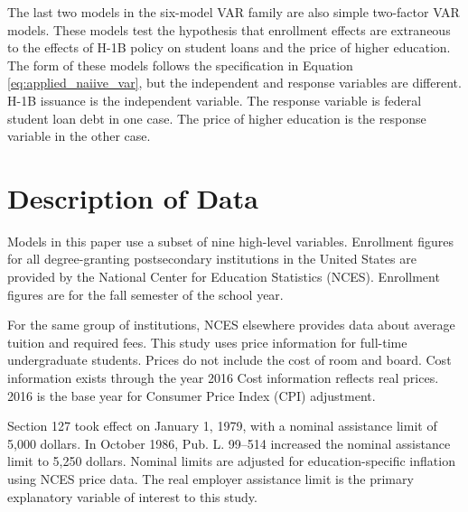 \documentclass[review]{elsarticle}
\begin{document}
The last two models in the six-model VAR family are also simple two-factor VAR models.
These models test the hypothesis that enrollment effects are extraneous
to the effects of H-1B policy on student loans and the price of higher education.
The form of these models follows the specification in Equation \ref{eq:applied_naiive_var},
but the independent and response variables are different.
H-1B issuance is the independent variable.
The response variable is federal student loan debt in one case.
The price of higher education is the response variable in the other case.

\section{Description of Data}

Models in this paper use a subset of nine high-level variables.
Enrollment figures for all degree-granting postsecondary institutions in the United States
are provided by the National Center for Education Statistics (NCES)\cite{nces_2019}.
Enrollment figures are for the fall semester of the school year.

For the same group of institutions,
NCES elsewhere provides data about average tuition and required fees\cite{nces_2017}.
This study uses price information for full-time undergraduate students.
Prices do not include the cost of room and board.
Cost information exists through the year 2016
Cost information reflects real prices.
2016 is the base year for Consumer Price Index (CPI) adjustment.

Section 127 took effect on January 1, 1979, with a nominal assistance limit of 5,000 dollars\cite{plaw95_600_1978}.
In October 1986, Pub. L. 99–514 increased the nominal assistance limit to 5,250 dollars\cite{plaw99_514_1986}.
Nominal limits are adjusted for education-specific inflation using NCES price data.
The real employer assistance limit is the primary explanatory variable of interest to this study.
\end{document}
